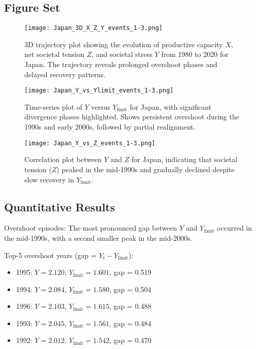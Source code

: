 \documentclass[12pt,a4paper]{article}
\begin{document}
\subsection{Figure Set}

\begin{figure}[H]
    \centering
    \texttt{[image: Japan\_3D\_X\_Z\_Y\_events\_1-3.png]}
    \caption{3D trajectory plot showing the evolution of productive capacity $X$, net societal tension $Z$, and societal stress $Y$ from 1980 to 2020 for Japan. The trajectory reveals prolonged overshoot phases and delayed recovery patterns.}
    \label{fig:japan_3d_x_z_y}
\end{figure}

\begin{figure}[H]
    \centering
    \texttt{[image: Japan\_Y\_vs\_Ylimit\_events\_1-3.png]}
    \caption{Time-series plot of $Y$ versus $Y_{\text{limit}}$ for Japan, with significant divergence phases highlighted. Shows persistent overshoot during the 1990s and early 2000s, followed by partial realignment.}
    \label{fig:japan_y_vs_ylimit}
\end{figure}

\begin{figure}[H]
    \centering
    \texttt{[image: Japan\_Y\_vs\_Z\_events\_1-3.png]}
    \caption{Correlation plot between $Y$ and $Z$ for Japan, indicating that societal tension ($Z$) peaked in the mid-1990s and gradually declined despite slow recovery in $Y_{\text{limit}}$.}
    \label{fig:japan_y_vs_z}
\end{figure}

\subsection{Quantitative Results}
Overshoot episodes: The most pronounced gap between $Y$ and $Y_{\text{limit}}$ occurred in the mid-1990s, with a second smaller peak in the mid-2000s.

Top-5 overshoot years (gap = $Y_t - Y_{\text{limit}}$):
\begin{itemize}
    \item 1995: $Y=2.120$, $Y_{\text{limit}}=1.601$, gap = 0.519
    \item 1994: $Y=2.084$, $Y_{\text{limit}}=1.580$, gap = 0.504
    \item 1996: $Y=2.103$, $Y_{\text{limit}}=1.615$, gap = 0.488
    \item 1993: $Y=2.045$, $Y_{\text{limit}}=1.561$, gap = 0.484
    \item 1992: $Y=2.012$, $Y_{\text{limit}}=1.542$, gap = 0.470
\end{itemize}
\end{document}

